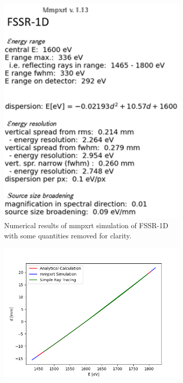 \begin{figure} [H]
	\begin{subfigure}[t]{0.37\textwidth}
	\centering
		\includegraphics[width=\textwidth]{Diagrams/FSSRmmpxrtData.PNG}
		\caption{Numerical results of mmpxrt 
		simulation of FSSR-1D with some 
		quantities removed for clarity.}
		\label{mmpxrtFSSRData}
	\end{subfigure}%
	\hfill
	\begin{subfigure}[t]{0.68\textwidth}
	\centering
		\includegraphics[width=\textwidth]{Diagrams/DispersionComparisonFSSR.png}

\end{subfigure}
\end{figure}
